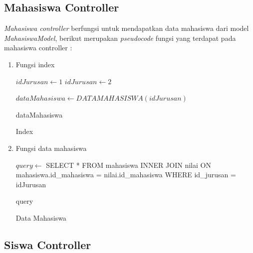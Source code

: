 \subsection{Mahasiswa Controller}
\label{subsec:mahasiswa controller}

\textit{Mahasiswa controller} berfungsi untuk mendapatkan data mahasiswa dari model \textit{MahasiswaModel}, berikut merupakan \textit{pseudocode} fungsi yang terdapat pada mahasiswa controller : \\

\begin{enumerate}
    \item Fungsi index \\
        \begin{algorithm}[H]
          \begin{algorithmic}[1]
                \State $idJurusan \gets 1$ 
                    \State $idJurusan \gets 2$
                \EndIf
                
                \State $dataMahasiswa \gets DATAMAHASISWA(idJurusan)$
                
                \State \Return dataMahasiswa
            \EndProcedure
          \end{algorithmic} 
          \caption{Index}
          \label{alg:index mahasiswa controller}
        \end{algorithm}
        
    \item Fungsi data mahasiswa \\
        \begin{algorithm}[H]
          \begin{algorithmic}[1]
                \State $query \gets$ SELECT * FROM mahasiswa INNER JOIN nilai ON mahasiswa.id\_mahasiswa = nilai.id\_mahasiswa WHERE id\_jurusan = idJurusan
                
                \State \Return query
            \EndProcedure
          \end{algorithmic} 
          \caption{Data Mahasiswa}
          \label{alg:data mahasiswa controller}
        \end{algorithm}
\end{enumerate}



\subsection{Siswa Controller}
\label{subsec:siswa controller}

